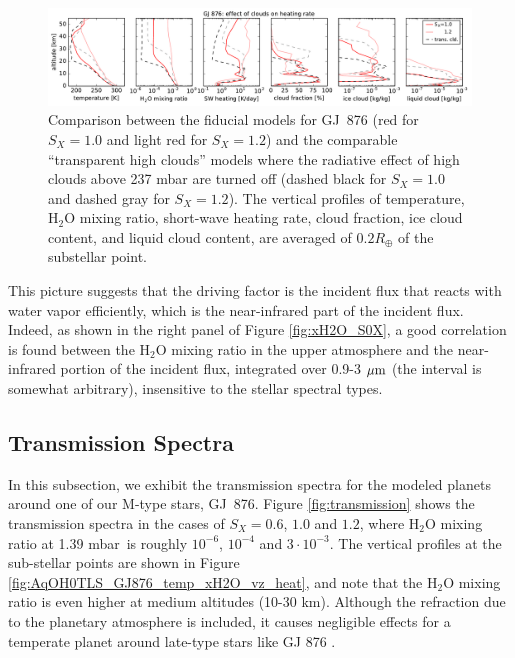 \documentclass[11pt,numberedappendix,twocolappendix,]{emulateapj}
\def\water{H$_2$O }
\def\preslevel{1.39 mbar\ }
\begin{document}
\begin{figure}[htb]
    \begin{center}
    \includegraphics[width=1\hsize]{fig/GJ876_heat_cld.pdf}
    \end{center}
\caption{Comparison between the fiducial models for GJ~876 (red for $S_X=1.0$ and light red for $S_X=1.2$) and the comparable ``transparent high clouds'' models where the radiative effect of high clouds above 237 mbar are turned off (dashed black for $S_X=1.0$ and dashed gray for $S_X=1.2$). The vertical profiles of temperature, \water mixing ratio, short-wave heating rate, cloud fraction, ice cloud content, and liquid cloud content, are averaged of $0.2R_{\oplus }$ of the substellar point. }
\label{fig:GJ876_heat_cld}
\end{figure}

This picture suggests that the driving factor is the incident flux that reacts with water vapor efficiently, which is the near-infrared part of the incident flux. 
Indeed, as shown in the right panel of Figure \ref{fig:xH2O_S0X}, a good correlation is found between the \water mixing ratio in the upper atmosphere and the near-infrared portion of the incident flux, integrated over 0.9-3 $\mu {\rm m}$ (the interval is somewhat arbitrary), insensitive to the stellar spectral types. 



\subsection{Transmission Spectra}
\label{ss:result_TransmissionSpectra}

In this subsection, we exhibit the transmission spectra for the modeled planets around one of our M-type stars, GJ~876. 
Figure \ref{fig:transmission} shows the transmission spectra in the cases of $S_X=0.6$, $1.0$ and $1.2$, where \water mixing ratio at \preslevel is roughly $10^{-6}$, $10^{-4}$ and $3\cdot 10^{-3}$. 
The vertical profiles at the sub-stellar points are shown in Figure \ref{fig:AqOH0TLS_GJ876_temp_xH2O_vz_heat}, and note that the \water mixing ratio is even higher at medium altitudes (10-30 km). 
Although the refraction due to the planetary atmosphere is included, it causes negligible effects for a temperate planet around late-type stars like GJ 876 \citep{Betremieux2014,Misra2014}. 
\end{document}
